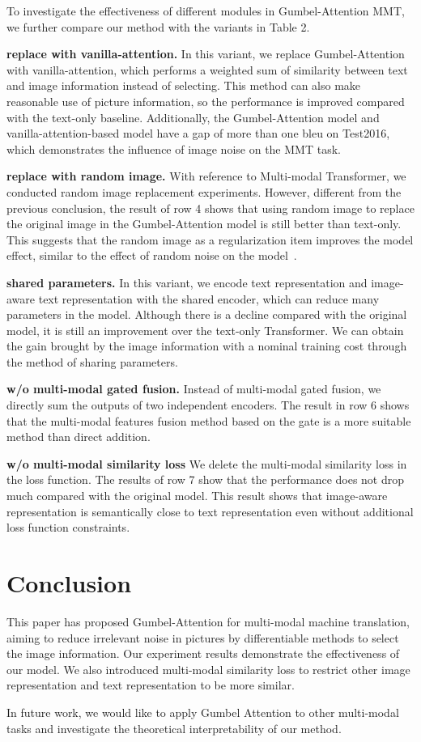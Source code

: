 \documentclass[11pt]{article}
\begin{document}
To investigate the effectiveness of different modules in Gumbel-Attention MMT, we further compare our method with the variants in Table 2.

\textbf{replace with vanilla-attention.} 
In this variant, we replace Gumbel-Attention with vanilla-attention, which performs a weighted sum of similarity between text and image information instead of selecting. This method can also make reasonable use of picture information, so the performance is improved compared with the text-only baseline. Additionally, the Gumbel-Attention model and vanilla-attention-based model have a gap of more than one bleu on Test2016, which demonstrates the influence of image noise on the MMT task.




\textbf{replace with random image.}
With reference to Multi-modal Transformer, we conducted random image replacement experiments.  
However, different from the previous conclusion, the result of row 4 shows that using random image to replace the original image in the Gumbel-Attention model is still better than text-only. 
This suggests that the random image as a regularization item improves the model effect, similar to the effect of random noise on the model~\citep{DBLP:journals/neco/Bishop95}.



\textbf{shared parameters.}
In this variant, we encode text representation and image-aware text representation with the shared encoder, which can reduce many parameters in the model. Although there is a decline compared with the original model, it is still an improvement over the text-only Transformer. We can obtain the gain brought by the image information with a nominal training cost through the method of sharing parameters.

\textbf{w/o multi-modal gated fusion.}
Instead of multi-modal gated fusion, we directly sum the outputs of two independent encoders. The result in row 6 shows that the multi-modal features fusion method based on the gate is a more suitable method than direct addition.  


\textbf{w/o multi-modal similarity loss}
We delete the multi-modal similarity loss in the loss function. The results of row 7 show that the performance does not drop much compared with the original model. This result shows that image-aware representation is semantically close to text representation even without additional loss function constraints.




\section{Conclusion}
This paper has proposed Gumbel-Attention for multi-modal machine translation, aiming to reduce irrelevant noise in pictures by differentiable methods to select the image information. Our experiment results demonstrate the effectiveness of our model. We also introduced multi-modal similarity loss to restrict other image representation and text representation to be more similar. 

In future work, we would like to apply Gumbel Attention to other multi-modal tasks and investigate the theoretical interpretability of our method.



\end{document}
